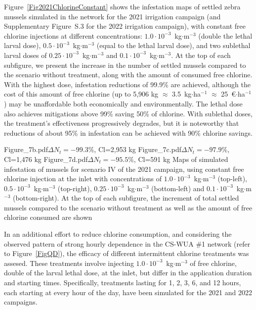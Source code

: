 \documentclass[review,authoryear]{elsarticle}
\begin{document}
Figure~\ref{Fig2021ChlorineConstant} shows the infestation maps of settled
zebra mussels simulated in the network for the 2021 irrigation campaign
(and Supplementary Figure~S.3 for the 2022 irrigation campaign), with constant
free chlorine injections at different concentrations:
$1.0\cdot10^{-3}$~kg$\cdot$m$^{-3}$ (double the lethal larval dose),
$0.5\cdot10^{-3}$~kg$\cdot$m$^{-3}$ (equal to the lethal larval dose), and two
sublethal larval doses of $0.25\cdot10^{-3}$~kg$\cdot$m$^{-3}$ and
$0.1\cdot10^{-3}$~kg$\cdot$m$^{-3}$. At the top of each subfigure, we present
the increase in the number of settled mussels compared to the scenario without
treatment, along with the amount of consumed free chlorine. With the highest
dose, infestation reductions of 99.9\% are achieved, although the cost of this
amount of free chlorine (up to 5,906 kg $\approx$ 3.5~kg$\cdot$ha$^{-1}$
$\approx$ 25~\euro{}$\cdot$ha$^{-1}$) may be unaffordable both economically and
environmentally. The lethal dose also achieves mitigations above 99\% saving
50\% of chlorine. With sublethal doses, the treatment's effectiveness
progressively degrades, but it is noteworthy that reductions of about 95\% in
infestation can be achieved with 90\% chlorine savings.

{Figure_7b.pdf}{$\Delta N_t=-99.3\%$, Cl=2,953 kg}
{Figure_7c.pdf}{$\Delta N_t=-97.9\%$, Cl=1,476 kg}
{Figure_7d.pdf}{$\Delta N_t=-95.5\%$, Cl=591 kg}
{Maps of simulated infestation of mussels for scenario IV of the 2021 campaign,
using constant free chlorine injection at the inlet with concentrations of
$1.0\cdot10^{-3}$~kg$\cdot$m$^{-3}$ (top-left),
$0.5\cdot10^{-3}$~kg$\cdot$m$^{-3}$ (top-right),
$0.25\cdot10^{-3}$~kg$\cdot$m$^{-3}$ (bottom-left) and
$0.1\cdot10^{-3}$~kg$\cdot$m$^{-3}$ (bottom-right). At the top of each
subfigure, the increment of total settled mussels compared to the scenario
without treatment as well as the amount of free chlorine consumed are
shown\label{Fig2021ChlorineConstant}}

In an additional effort to reduce chlorine consumption, and considering the
observed pattern of strong hourly dependence in the CS-WUA \#1 network (refer to
Figure~\ref{FigQD}), the efficacy of different intermittent chlorine treatments
was assesed. These treatments involve injecting
$1.0\cdot10^{-3}$~kg$\cdot$m$^{-3}$ of free chlorine, double of the larval
lethal dose, at the inlet, but differ in the application duration and
starting times. Specifically, treatments lasting for 1, 2, 3, 6, and 12 hours,
each starting at every hour of the day, have been simulated for the 2021 and
2022 campaigns.
\end{document}
